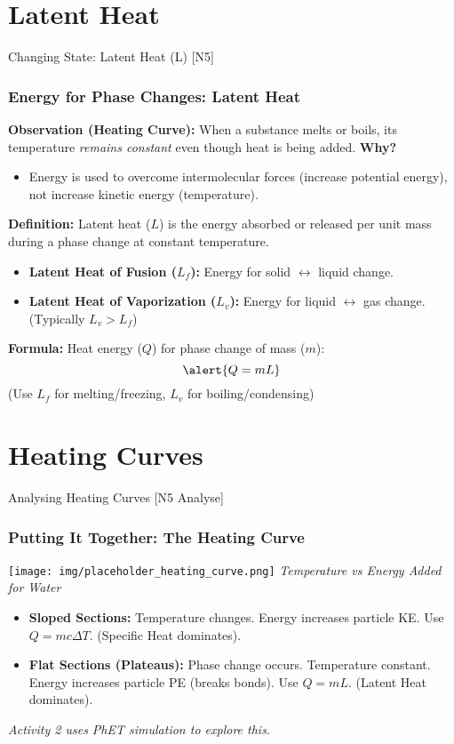 \documentclass[xcolor=svgnames]{beamer}
\begin{document}
\section{Latent Heat}
\begin{frame}{Changing State: Latent Heat (L) [N5]}
    \frametitle{Energy for Phase Changes: Latent Heat}
    \textbf{Observation (Heating Curve):} When a substance melts or boils, its temperature \textit{remains constant} even though heat is being added.
    \vspace{1em}
    \textbf{Why?}
    \begin{itemize}
        \item Energy is used to overcome intermolecular forces (increase potential energy), not increase kinetic energy (temperature).
    \end{itemize}
    \vspace{1em}
    \textbf{Definition:} Latent heat ($L$) is the energy absorbed or released per unit mass during a phase change at constant temperature.
    \begin{itemize}
        \item \textbf{Latent Heat of Fusion ($L_f$):} Energy for solid $\leftrightarrow$ liquid change.
        \item \textbf{Latent Heat of Vaporization ($L_v$):} Energy for liquid $\leftrightarrow$ gas change. (Typically $L_v > L_f$)
    \end{itemize}
    \textbf{Formula:} Heat energy ($Q$) for phase change of mass ($m$):
    \begin{equation*}
    \alert{Q = mL}
    \end{equation*}
    (Use $L_f$ for melting/freezing, $L_v$ for boiling/condensing)
\end{frame}

\section{Heating Curves}
\begin{frame}{Analysing Heating Curves [N5 Analyse]}
    \frametitle{Putting It Together: The Heating Curve}
    \begin{center}
    \texttt{[image: img/placeholder\_heating\_curve.png]} %
    \textit{Temperature vs Energy Added for Water}
    \end{center}
    \begin{itemize}
        \item \textbf{Sloped Sections:} Temperature changes. Energy increases particle KE. Use $Q=mc\Delta T$. (Specific Heat dominates).
        \item \textbf{Flat Sections (Plateaus):} Phase change occurs. Temperature constant. Energy increases particle PE (breaks bonds). Use $Q=mL$. (Latent Heat dominates).
    \end{itemize}
    \textit{Activity 2 uses PhET simulation to explore this.}
\end{frame}
\end{document}
